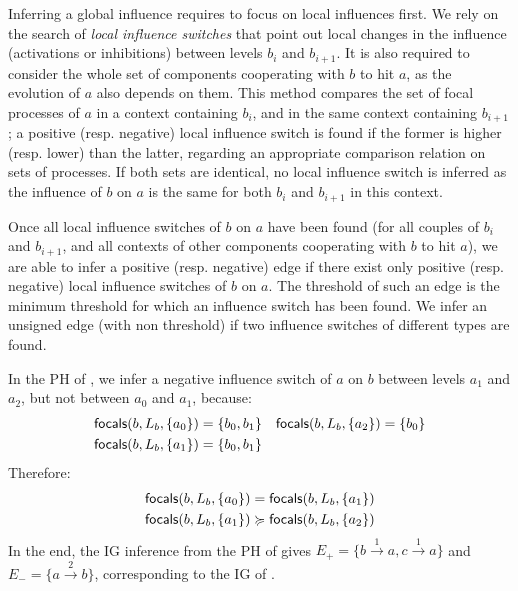 Inferring a global influence requires to focus on local influences first.
We rely on the search of \emph{local influence switches} that point out local changes in the influence (activations or inhibitions) between levels $b_i$ and $b_{i+1}$.
It is also required to consider the whole set of components cooperating with $b$ to hit $a$, as the evolution of $a$ also depends on them.
This method compares the set of focal processes of $a$ in a context containing $b_i$, and in the same context containing $b_{i+1}$;
a positive (resp. negative) local influence switch is found if the former is higher (resp. lower) than the latter, regarding an appropriate comparison relation on sets of processes.
If both sets are identical, no local influence switch is inferred as the influence of $b$ on $a$ is the same for both $b_i$ and $b_{i+1}$ in this context.

Once all local influence switches of $b$ on $a$ have been found (for all couples of $b_i$ and $b_{i+1}$, and all contexts of other components cooperating with $b$ to hit $a$),
we are able to infer a positive (resp. negative) edge if there exist only positive (resp. negative) local influence switches of $b$ on $a$.
The threshold of such an edge is the minimum threshold for which an influence switch has been found.
We infer an unsigned edge (with non threshold) if two influence switches of different types are found.

\begin{comment}
The inference of the \emph{influence switches}, which point out local changes in the influence (activations or inhibitions) between levels $b_i$ and $b_{i+1}$, requires to consider the whole set of components cooperating with $b$ to hit $a$.
The method relies on the comparison of the focal processes of $a$ in a context containing $b_i$, and in the same context containing $b_{i+1}$.
We are able to infer a positive (resp. negative) edge if there exist corresponding influence switches with the same sign only; the threshold of such an edge is the minimum threshold for which an influence switch has been found.
We infer an unsigned edge (with non threshold) when two influence switches with different signs are found.
\end{comment}

\begin{example*}
In the PH of , we infer a negative influence switch of $a$ on $b$ between levels $a_1$ and $a_2$, but not between $a_0$ and $a_1$, because:
\begin{align*}
\mathsf{focals}(b, L_b, \{a_0\}) &= \{b_0, b_1\} & \mathsf{focals}(b, L_b, \{a_2\}) &= \{b_0\} \\
\mathsf{focals}(b, L_b, \{a_1\}) &= \{b_0, b_1\}
\end{align*}
Therefore:
\begin{align*}
\mathsf{focals}(b, L_b, \{a_0\}) &= \mathsf{focals}(b, L_b, \{a_1\}) \\
\mathsf{focals}(b, L_b, \{a_1\}) &\succcurlyeq \mathsf{focals}(b, L_b, \{a_2\})
\end{align*}
In the end, the IG inference from the PH of  gives
$E_+ = \{b \xrightarrow{1} a, c \xrightarrow{1} a\}$ and
$E_- = \{a \xrightarrow{2} b\}$, corresponding to the IG of .
\end{example*}
